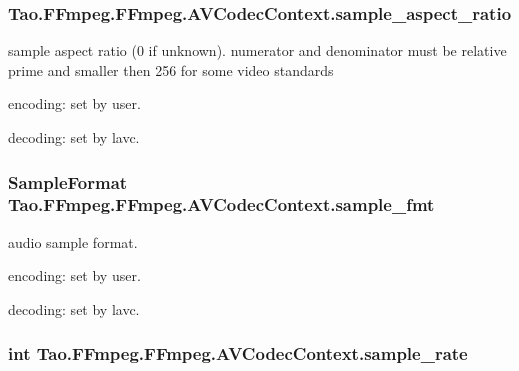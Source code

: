 \label{struct_tao_1_1_f_fmpeg_1_1_f_fmpeg_1_1_a_v_codec_context_a0a266fb768f6b9d5753db5f96eb34579}
\hypertarget{struct_tao_1_1_f_fmpeg_1_1_f_fmpeg_1_1_a_v_codec_context_a8555ab1c3522cac34fd93871cb308fa9}{
\subsubsection[{sample\_\-aspect\_\-ratio}]{ {\bf Tao.FFmpeg.FFmpeg.AVCodecContext.sample\_\-aspect\_\-ratio}}}
\label{struct_tao_1_1_f_fmpeg_1_1_f_fmpeg_1_1_a_v_codec_context_a8555ab1c3522cac34fd93871cb308fa9}
sample aspect ratio (0 if unknown). numerator and denominator must be relative prime and smaller then 256 for some video standards
\begin{DoxyItemize}
\item encoding: set by user.
\item decoding: set by lavc. 
\end{DoxyItemize}\hypertarget{struct_tao_1_1_f_fmpeg_1_1_f_fmpeg_1_1_a_v_codec_context_a8fded1c6367f7ded8bf54d2f9e923489}{
\subsubsection[{sample\_\-fmt}]{\setlength{\rightskip}{0pt plus 5cm}SampleFormat {\bf Tao.FFmpeg.FFmpeg.AVCodecContext.sample\_\-fmt}}}
\label{struct_tao_1_1_f_fmpeg_1_1_f_fmpeg_1_1_a_v_codec_context_a8fded1c6367f7ded8bf54d2f9e923489}
audio sample format.
\begin{DoxyItemize}
\item encoding: set by user.
\item decoding: set by lavc. 
\end{DoxyItemize}\hypertarget{struct_tao_1_1_f_fmpeg_1_1_f_fmpeg_1_1_a_v_codec_context_af87b640341719b6a8ad693a314d00e51}{
\subsubsection[{sample\_\-rate}]{\setlength{\rightskip}{0pt plus 5cm}int {\bf Tao.FFmpeg.FFmpeg.AVCodecContext.sample\_\-rate}}}
